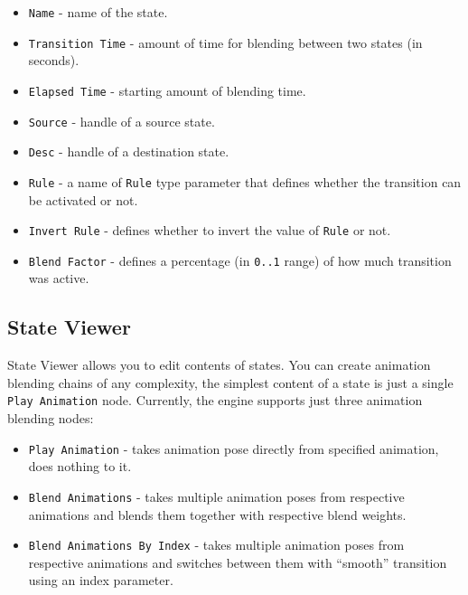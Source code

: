 \documentclass[
]{book}
\providecommand{\tightlist}{%
  \setlength{\itemsep}{0pt}\setlength{\parskip}{0pt}}
\theoremstyle{definition}
\theoremstyle{definition}
\theoremstyle{definition}
\theoremstyle{definition}
\theoremstyle{remark}
\begin{document}
\begin{itemize}
\tightlist
\item
  \texttt{Name} - name of the state.
\item
  \texttt{Transition\ Time} - amount of time for blending between two states (in seconds).
\item
  \texttt{Elapsed\ Time} - starting amount of blending time.
\item
  \texttt{Source} - handle of a source state.
\item
  \texttt{Desc} - handle of a destination state.
\item
  \texttt{Rule} - a name of \texttt{Rule} type parameter that defines whether the transition can be activated or not.
\item
  \texttt{Invert\ Rule} - defines whether to invert the value of \texttt{Rule} or not.
\item
  \texttt{Blend\ Factor} - defines a percentage (in \texttt{0..1} range) of how much transition was active.
\end{itemize}

\subsection{State Viewer}\label{state-viewer}

State Viewer allows you to edit contents of states. You can create animation blending chains of any complexity, the simplest content of a state is just a single \texttt{Play\ Animation} node. Currently, the engine supports just three animation blending nodes:

\begin{itemize}
\tightlist
\item
  \texttt{Play\ Animation} - takes animation pose directly from specified animation, does nothing to it.
\item
  \texttt{Blend\ Animations} - takes multiple animation poses from respective animations and blends them together with respective blend weights.
\item
  \texttt{Blend\ Animations\ By\ Index} - takes multiple animation poses from respective animations and switches between them with ``smooth'' transition using an index parameter.
\end{itemize}
\end{document}
